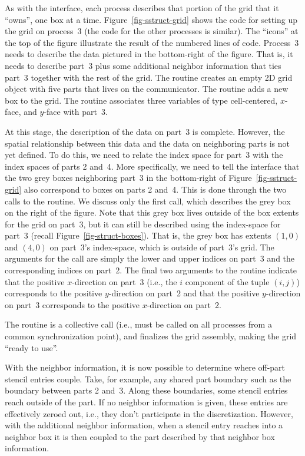 As with the  interface, each process describes that portion of the
grid that it ``owns'', one box at a time.  Figure~\ref{fig-sstruct-grid} shows
the code for setting up the grid on process~3 (the code for the other processes
is similar).  The ``icons'' at the top of the figure illustrate the result of
the numbered lines of code.  Process~3 needs to describe the data pictured in
the bottom-right of the figure.  That is, it needs to describe part~3 plus some
additional neighbor information that ties part~3 together with the rest of the
grid.  The  routine creates an empty 2D grid object with five
parts that lives on the  communicator.  The
 routine adds a new box to the grid.  The
 routine associates three variables of type cell-centered,
$x$-face, and $y$-face with part~3.

At this stage, the description of the data on part~3 is complete.  However, the
spatial relationship between this data and the data on neighboring parts is not
yet defined.  To do this, we need to relate the index space for part~3 with the
index spaces of parts 2 and~4.  More specifically, we need to tell the interface
that the two grey boxes neighboring part~3 in the bottom-right of
Figure~\ref{fig-sstruct-grid} also correspond to boxes on parts 2 and~4.  This
is done through the two calls to the  routine.  We
discuss only the first call, which describes the grey box on the right of the
figure.  Note that this grey box lives outside of the box extents for the grid
on part~3, but it can still be described using the index-space for part~3
(recall Figure~\ref{fig-struct-boxes}).  That is, the grey box has extents
$(1,0)$ and $(4,0)$ on part~3's index-space, which is outside of part~3's grid.
The arguments for the  call are simply the lower and
upper indices on part~3 and the corresponding indices on part~2.  The final two
arguments to the routine indicate that the positive $x$-direction on part~3
(i.e., the $i$ component of the tuple $(i,j)$) corresponds to the positive
$y$-direction on part~2 and that the positive $y$-direction on part~3
corresponds to the positive $x$-direction on part~2.

The  routine is a collective call (i.e., must be called on all
processes from a common synchronization point), and finalizes the grid
assembly, making the grid ``ready to use''.

With the neighbor information, it is now possible to determine where off-part
stencil entries couple.  Take, for example, any shared part boundary such as
the boundary between parts 2 and~3.  Along these boundaries, some stencil
entries reach outside of the part.  If no neighbor information is given, these
entries are effectively zeroed out, i.e., they don't participate in the
discretization.  However, with the additional neighbor information, when a
stencil entry reaches into a neighbor box it is then coupled to the part
described by that neighbor box information.

